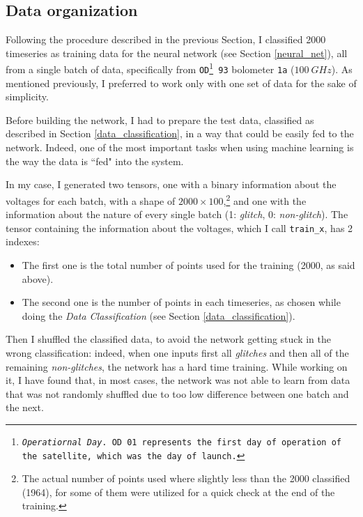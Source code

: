\documentclass[12pt,a4paper,final]{book}			%
\begin{document}
			\subsection{Data organization}\label{organizing_the_data_for_the_network}
			Following the procedure described in the previous Section, I classified 2000 timeseries as training data for the neural network (see Section \ref{neural_net}), all from a single batch of data, specifically from \texttt{OD\footnote{\textit{Operatiornal Day}. OD 01 represents the first day of operation of the satellite, which was the day of launch.} 93} bolometer \texttt{1a} ($100~\unit{GHz}$). 
			As mentioned previously, I preferred to work only with one set of data for the sake of simplicity.
			
			Before building the network, I had to prepare the test data, classified as described in Section \ref{data_classification}, in a way that could be easily fed to the network. Indeed, one of the most important tasks when using machine learning is the way the data is ``fed" into the system.			
			
			In my case, I generated two tensors, one with a binary information about the voltages for each batch, with a shape of $2000 \times 100$,\footnote{The actual number of points used where slightly less than the 2000 classified (1964), for some of them were utilized for a quick check at the end of the training.} and one with the information about the nature of every single batch (1: \textit{glitch}, 0: \textit{non-glitch}).
			The tensor containing the information about the voltages, which I call \texttt{train\_x}, has 2 indexes:
			\begin{itemize}
				\item The first one is the total number of points used for the training (2000, as said above).
				\item The second one is the number of points in each timeseries, as chosen while doing the \textit{Data Classification} (see Section \ref{data_classification}).
			\end{itemize}
			
			Then I shuffled the classified data, to avoid the network getting stuck in the wrong classification: indeed, when one inputs first all \textit{glitches} and then all of the remaining \textit{non-glitches}, the network has a hard time training.
			While working on it, I have found that, in most cases, the network was not able to learn from data that was not randomly shuffled due to too low difference between one batch and the next.
			
\end{document}
